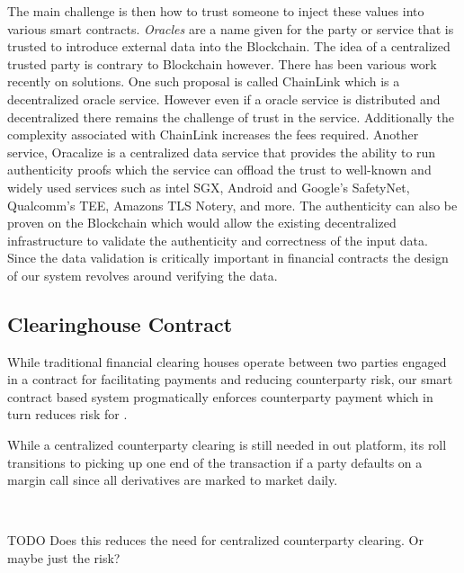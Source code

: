 The main challenge is then how to trust someone to inject these values into various smart contracts.
\textit{Oracles} are a name given for the party or service that is trusted to introduce external data into the Blockchain.
The idea of a centralized trusted party is contrary to Blockchain however.
There has been various work recently on solutions.
One such proposal is called ChainLink \cite{ChainLink} which is a decentralized oracle service.
However even if a oracle service is distributed and decentralized there remains the challenge of trust in the service.
Additionally the complexity associated with ChainLink increases the fees required.
Another service, Oracalize \cite{Oracalize} is a centralized data service that provides the ability to run authenticity proofs which the service can offload the trust to well-known and widely used services such as intel SGX, Android and Google's SafetyNet, Qualcomm's TEE, Amazons TLS Notery, and more.
The authenticity can also be proven on the Blockchain which would allow the existing decentralized infrastructure to validate the authenticity and correctness of the input data.
Since the data validation is critically important in financial contracts the design of our system revolves around verifying the data.




\subsection{Clearinghouse Contract}
\label{clearinghouse}

While traditional financial clearing houses operate between two parties engaged in a contract for facilitating payments and reducing counterparty risk, our smart contract based system progmatically enforces counterparty payment which in turn reduces risk for .

While a centralized counterparty clearing is still needed in out platform, its roll transitions to picking up one end of the transaction if a party defaults on a margin call since all derivatives are marked to market daily.

\

TODO Does this reduces the need for centralized counterparty clearing. Or maybe just the risk? %


